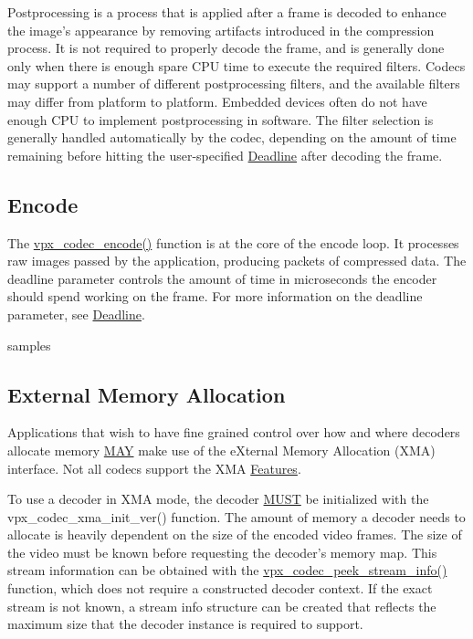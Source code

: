 Postprocessing is a process that is applied after a frame is decoded to enhance the image's appearance by removing artifacts introduced in the compression process. It is not required to properly decode the frame, and is generally done only when there is enough spare C\-P\-U time to execute the required filters. Codecs may support a number of different postprocessing filters, and the available filters may differ from platform to platform. Embedded devices often do not have enough C\-P\-U to implement postprocessing in software. The filter selection is generally handled automatically by the codec, depending on the amount of time remaining before hitting the user-\/specified \hyperlink{usage_usage_deadline}{Deadline} after decoding the frame. \hypertarget{usage_encode}{}\subsection{Encode}\label{usage_encode}
The \hyperlink{group__encoder_gaf990542e2aeb389f05fae3e9c7803639}{vpx\-\_\-codec\-\_\-encode()} function is at the core of the encode loop. It processes raw images passed by the application, producing packets of compressed data. The {\ttfamily deadline} parameter controls the amount of time in microseconds the encoder should spend working on the frame. For more information on the {\ttfamily deadline} parameter, see \hyperlink{usage_usage_deadline}{Deadline}.

samples \hypertarget{usage_xma}{}\subsection{External Memory Allocation}\label{usage_xma}
Applications that wish to have fine grained control over how and where decoders allocate memory \hyperlink{rfc2119_MAY}{M\-A\-Y} make use of the e\-Xternal Memory Allocation (X\-M\-A) interface. Not all codecs support the X\-M\-A \hyperlink{usage_usage_features}{Features}.

To use a decoder in X\-M\-A mode, the decoder \hyperlink{rfc2119_MUST}{M\-U\-S\-T} be initialized with the vpx\-\_\-codec\-\_\-xma\-\_\-init\-\_\-ver() function. The amount of memory a decoder needs to allocate is heavily dependent on the size of the encoded video frames. The size of the video must be known before requesting the decoder's memory map. This stream information can be obtained with the \hyperlink{group__decoder_gadfee4664d644175d5aac1465ef11c4b0}{vpx\-\_\-codec\-\_\-peek\-\_\-stream\-\_\-info()} function, which does not require a constructed decoder context. If the exact stream is not known, a stream info structure can be created that reflects the maximum size that the decoder instance is required to support.

